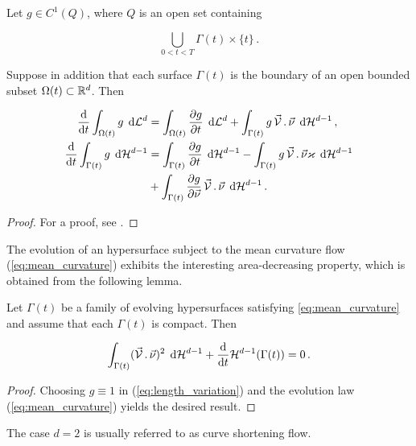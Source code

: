 \begin{lemma}
Let $g \in C^1(Q)$, where $Q$ is an open set containing

\begin{equation}
\bigcup_{0 < t < T} \Gamma(t) \times \{ t \} \, .
\end{equation}

Suppose in addition that each surface $\Gamma(t)$ is the boundary of an open
bounded subset $\Omega(t) \subset {\mathbb R}^{d}$. Then

\begin{align}
\frac{\rm d}{{\rm d}t} \int_{\Omega(t)} g \, \;{\rm d}{\cal L}^{d} & =
\int_{\Omega(t)} \frac{\partial g}{\partial t} \, \;{\rm d}{\cal L}^{d}
+ \int_{\Gamma(t)} g \,\vec{\mathcal{V}}\,.\,\vec\nu \, \;{\rm d}{\cal H}^{d-1} \, ,
\label{eq:volume_variation} \\
\frac{\rm d}{{\rm d}t} \int_{\Gamma(t)} g \, \;{\rm d}{\cal H}^{d-1} & =
\int_{\Gamma(t)} \frac{\partial g}{\partial t} \, \;{\rm d}{\cal H}^{d-1} -
\int_{\Gamma(t)} g \, \vec{\mathcal{V}}\,.\,\vec\nu \varkappa \, \;{\rm d}{\cal H}^{d-1}
\nonumber \\
& + \int_{\Gamma(t)} \frac{\partial g}{\partial \vec{\nu}}\,
\vec{\mathcal{V}}\,.\,\vec\nu \, \;{\rm d}{\cal H}^{d-1} \, .
\label{eq:length_variation}
\end{align}
\end{lemma}

\begin{proof}
For a proof, see \cite[\S~2.6, Lemma 2.1]{DeckelnickDE05}.
\end{proof}

The evolution of an hypersurface subject to the mean curvature flow
(\ref{eq:mean_curvature}) exhibits the interesting area-decreasing property,
which is obtained from the following lemma.

\begin{lemma}
Let $\Gamma(t)$ be a family of evolving hypersurfaces
satisfying \eqref{eq:mean_curvature} and assume that each $\Gamma(t)$ is
compact. Then

\begin{equation}
\int_{\Gamma(t)} (\vec{\mathcal{V}}\,.\,\vec\nu)^2 \, \;{\rm d}{\cal H}^{d-1} +
\frac{\rm d}{{\rm d}t} \mathcal{H}^{d-1}(\Gamma(t)) = 0 \, . \label{eq:length_decrease}
\end{equation}

\end{lemma}

\begin{proof}
Choosing $g \equiv 1$ in (\ref{eq:length_variation}) and the evolution law
(\ref{eq:mean_curvature}) yields the desired result.
\end{proof}
The case $d = 2$ is usually referred to as curve shortening flow.

